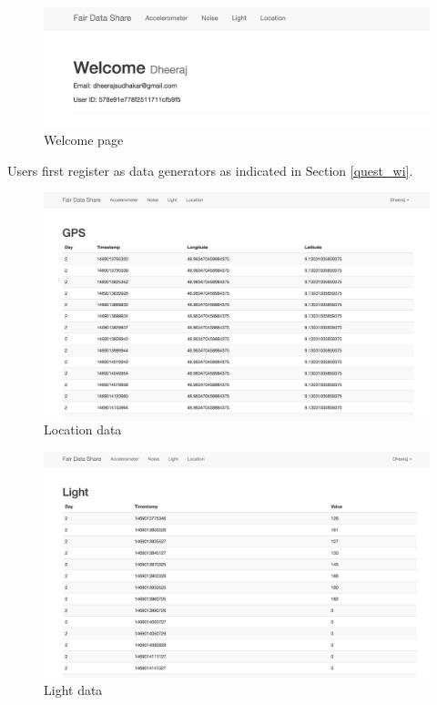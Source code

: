 \begin{figure}[ht!]
\centering
\includegraphics[width=\textwidth,keepaspectratio]{./images/fds_user_welcome}
\caption{Welcome page\label{fig:fdsdash}}
\end{figure}

Users first register as data generators as indicated in Section \ref{quest_wi}.

\begin{figure}[ht!]
\centering
\includegraphics[width=\textwidth,keepaspectratio]{./images/fds_user_gps_full}
\caption{Location data\label{fig:fdsgps}}
\end{figure}

\begin{figure}[ht!]
\centering
\includegraphics[width=\textwidth,keepaspectratio]{./images/fds_user_light_full}
\caption{Light data \label{fig:fdslight}}
\end{figure}

